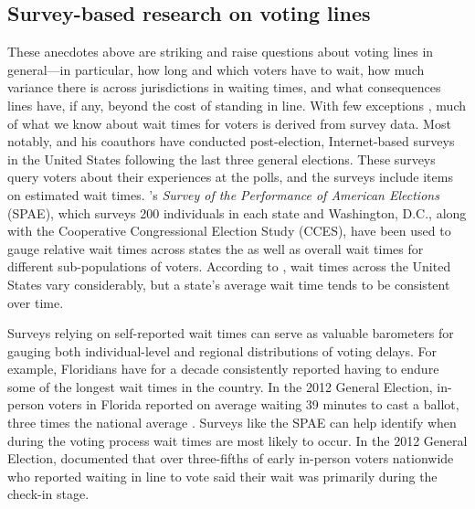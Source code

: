 \documentclass[12pt,titlepage]{article}
\begin{document}
\subsection*{Survey-based research on voting lines}

These anecdotes above are striking and raise questions about voting
lines in general---in particular, how long and which voters have to
wait, how much variance there is across jurisdictions in waiting
times, and what consequences lines have, if any, beyond the cost of
standing in line.  With few exceptions
\citep[e.g.,][]{spencermarkovits:renege, herronsmith:hanoverstudy,
  pettigrew:longlinesminorityprecincts}, much of what we know about
wait times for voters is derived from survey data. Most notably,
\citet{stewart:waitingtovote2012} and his coauthors have conducted
post-election, Internet-based surveys in the United States following
the last three general elections.  These surveys query voters about
their experiences at the polls, and the surveys include items on
estimated wait times.  \citeauthor{stewart:waitingtovote2012}'s
\emph{Survey of the Performance of American Elections} (SPAE), which
surveys 200 individuals in each state and Washington, D.C., along with
the Cooperative Congressional Election Study (CCES), have been used to
gauge relative wait times across states the as well as overall wait
times for different sub-populations of voters.  According to
\citeauthor{stewart:waitingtovote2012}, wait times across the United
States vary considerably, but a state's average wait time tends to be
consistent over time.

Surveys relying on self-reported wait times can serve as valuable
barometers for gauging both individual-level and regional
distributions of voting delays.  For example, Floridians have for a
decade consistently reported having to endure some of the longest wait
times in the country. In the 2012 General Election, in-person voters
in Florida reported on average waiting 39 minutes to cast a ballot,
three times the national average \citep{stewart:waitingtovote2012}.
Surveys like the SPAE can help identify when during the voting process
wait times are most likely to occur.  In the 2012 General Election,
\citeauthor{stewart:waitingtovote2012} documented that over
three-fifths of early in-person voters nationwide who reported waiting
in line to vote said their wait was primarily during the check-in
stage.
\end{document}

